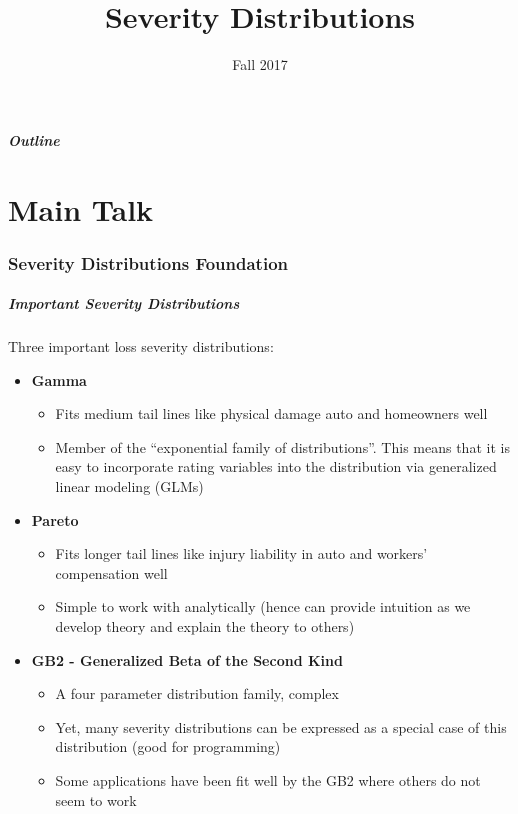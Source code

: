 \documentclass{beamer}
\title[Severity]{Severity Distributions}
\date[Fall 2017]{Fall 2017}
\begin{document}
\frame{\titlepage}

\begin{frame}
  \frametitle{Outline}
     \tableofcontents[part=1]
\end{frame}

\part<presentation>{Main Talk}


\section[Foundations]{Severity Distributions Foundation}


\begin{frame}[shrink=2]
\frametitle{Important Severity Distributions}

Three important loss severity distributions: \vspace{2mm}
\begin{itemize}
\item \textbf{Gamma}
\begin{itemize}
\item Fits medium tail lines like physical damage auto and homeowners well
\item Member of the ``exponential family of distributions''. This means that it is easy to incorporate rating variables into the distribution via generalized linear modeling
(GLMs) \vspace{2mm}
\end{itemize}
\item \textbf{Pareto}
\begin{itemize}
\item Fits longer tail lines like injury liability in auto and workers' compensation well
\item Simple to work with analytically (hence can provide intuition as we develop theory and explain the theory to
others) \vspace{2mm}
\end{itemize}
\item \textbf{GB2 - Generalized Beta of the Second Kind}
\begin{itemize}
\item A four parameter distribution family, complex
\item Yet, many severity distributions can be expressed as a special case of this distribution (good for programming)
\item Some applications have been fit well by the GB2 where others do not seem to
work \vspace{2mm}
\end{itemize}
\end{itemize}
\end{frame}
\end{document}
